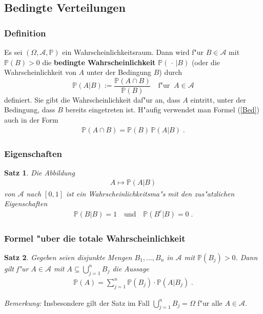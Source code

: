 \documentclass[ngerman,draft,parskip=half,twoside]{scrartcl}
\newtheorem{thm}{Satz}[section]
\newcommand*{\Algeb}{\mathcal{A}}   %
\newcommand*{\WKM}{\mathbb{P}}      %
\begin{document}
\subsection{Bedingte Verteilungen}
\subsubsection{Definition}
Es sei $(\Omega,\Algeb,\WKM)$ ein Wahrscheinlichkeitsraum. Dann wird
f"ur $B\in \Algeb$ mit $\WKM(B)>0$ die \textbf{bedingte Wahrscheinlichkeit} $\WKM(\,\cdot\,|B)$
(oder die Wahrscheinlichkeit von $A$ unter der Bedingung $B$)
durch
\begin{equation}
\label{Bed}
 \WKM(A|B):=\frac{\WKM(A\cap B)}{\WKM(B)}\quad\mbox{f"ur}\;\;A\in\Algeb
\end{equation}
definiert. Sie gibt die Wahrscheinlichkeit daf"ur an, dass $A$
eintritt, unter der Bedingung, dass $B$ bereits eingetreten ist. H"aufig verwendet man
Formel (\ref{Bed}) auch in der Form
\begin{gather*}
  \WKM(A\cap B)= \WKM(B)\,\WKM(A|B)\;.
\end{gather*}
\subsubsection{Eigenschaften}
\begin{thm}
Die Abbildung
  \begin{gather*}
    A\mapsto \WKM(A|B)
  \end{gather*}
von $\Algeb$ nach $[0,1]$ ist ein Wahrscheinlichkeitsma"s mit den zus"atzlichen Eigenschaften
  \begin{gather*}
    \WKM(B|B)=1\quad\mbox{und}\quad\WKM(B^c|B)=0\;.
  \end{gather*}
\end{thm}
\subsubsection{Formel "uber die totale Wahrscheinlichkeit}
\begin{thm}
\label{total}
Gegeben seien disjunkte Mengen $B_1,\ldots,B_n$ in $\Algeb$ mit
$\WKM(B_j)>0$. Dann gilt f"ur $A\in \Algeb$ mit $A\subseteq\bigcup_{j=1}^n B_j$
die Aussage
  \begin{gather*}
    \WKM(A)=\sum_{j=1}^n\WKM(B_j)\cdot\WKM(A|B_j)\;.
  \end{gather*}
\end{thm}
\textit{Bemerkung:} Insbesondere gilt der Satz im Fall $\bigcup_{j=1}^n B_j=\Omega$
f"ur alle $A\in\Algeb$.
\end{document}
